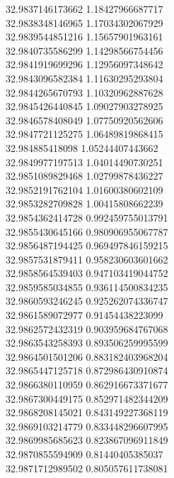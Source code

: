 {32.9837146173662	1.18427966687717\\
32.9838348146965	1.17034302067929\\
32.9839544851216	1.15657901963161\\
32.9840735586299	1.14298566754456\\
32.9841919699296	1.12956097348642\\
32.9843096582384	1.11630295293804\\
32.9844265670793	1.10320962887628\\
32.9845426440845	1.09027903278925\\
32.9846578408049	1.07750920562606\\
32.9847721125275	1.06489819868415\\
32.984885418098	1.05244407443662\\
32.9849977197513	1.04014490730251\\
32.9851089829468	1.02799878436227\\
32.9852191762104	1.01600380602109\\
32.9853282709828	1.00415808662239\\
32.9854362414728	0.992459755013791\\
32.9855430645166	0.980906955067787\\
32.9856487194425	0.969497846159215\\
32.9857531879411	0.958230603601662\\
32.9858564539403	0.947103419044752\\
32.9859585034855	0.936114500834235\\
32.9860593246245	0.925262074336747\\
32.9861589072977	0.91454438223099\\
32.9862572432319	0.903959684767068\\
32.9863543258393	0.893506259995599\\
32.9864501501206	0.883182403968204\\
32.9865447125718	0.872986430910874\\
32.9866380110959	0.862916673371677\\
32.9867300449175	0.852971482344209\\
32.9868208145021	0.843149227368119\\
32.9869103214779	0.833448296607995\\
32.9869985685623	0.823867096911849\\
32.9870855594909	0.81440405385037\\
32.9871712989502	0.805057611738081\\
}
